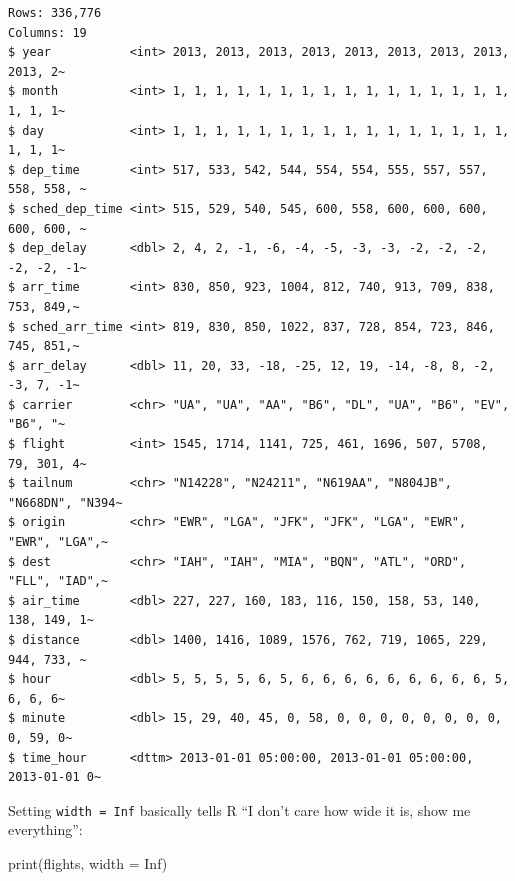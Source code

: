 \documentclass[
  letterpaper,
  DIV=11,
  numbers=noendperiod]{scrreprt}
\newenvironment{Shaded}{\begin{snugshade}}{\end{snugshade}}
\newcommand{\AttributeTok}[1]{\textcolor[rgb]{0.40,0.45,0.13}{#1}}
\newcommand{\ConstantTok}[1]{\textcolor[rgb]{0.56,0.35,0.01}{#1}}
\newcommand{\FunctionTok}[1]{\textcolor[rgb]{0.28,0.35,0.67}{#1}}
\newcommand{\NormalTok}[1]{\textcolor[rgb]{0.00,0.23,0.31}{#1}}
\begin{document}
\begin{verbatim}
Rows: 336,776
Columns: 19
$ year           <int> 2013, 2013, 2013, 2013, 2013, 2013, 2013, 2013, 2013, 2~
$ month          <int> 1, 1, 1, 1, 1, 1, 1, 1, 1, 1, 1, 1, 1, 1, 1, 1, 1, 1, 1~
$ day            <int> 1, 1, 1, 1, 1, 1, 1, 1, 1, 1, 1, 1, 1, 1, 1, 1, 1, 1, 1~
$ dep_time       <int> 517, 533, 542, 544, 554, 554, 555, 557, 557, 558, 558, ~
$ sched_dep_time <int> 515, 529, 540, 545, 600, 558, 600, 600, 600, 600, 600, ~
$ dep_delay      <dbl> 2, 4, 2, -1, -6, -4, -5, -3, -3, -2, -2, -2, -2, -2, -1~
$ arr_time       <int> 830, 850, 923, 1004, 812, 740, 913, 709, 838, 753, 849,~
$ sched_arr_time <int> 819, 830, 850, 1022, 837, 728, 854, 723, 846, 745, 851,~
$ arr_delay      <dbl> 11, 20, 33, -18, -25, 12, 19, -14, -8, 8, -2, -3, 7, -1~
$ carrier        <chr> "UA", "UA", "AA", "B6", "DL", "UA", "B6", "EV", "B6", "~
$ flight         <int> 1545, 1714, 1141, 725, 461, 1696, 507, 5708, 79, 301, 4~
$ tailnum        <chr> "N14228", "N24211", "N619AA", "N804JB", "N668DN", "N394~
$ origin         <chr> "EWR", "LGA", "JFK", "JFK", "LGA", "EWR", "EWR", "LGA",~
$ dest           <chr> "IAH", "IAH", "MIA", "BQN", "ATL", "ORD", "FLL", "IAD",~
$ air_time       <dbl> 227, 227, 160, 183, 116, 150, 158, 53, 140, 138, 149, 1~
$ distance       <dbl> 1400, 1416, 1089, 1576, 762, 719, 1065, 229, 944, 733, ~
$ hour           <dbl> 5, 5, 5, 5, 6, 5, 6, 6, 6, 6, 6, 6, 6, 6, 6, 5, 6, 6, 6~
$ minute         <dbl> 15, 29, 40, 45, 0, 58, 0, 0, 0, 0, 0, 0, 0, 0, 0, 59, 0~
$ time_hour      <dttm> 2013-01-01 05:00:00, 2013-01-01 05:00:00, 2013-01-01 0~
\end{verbatim}

Setting \texttt{width\ =\ Inf} basically tells R ``I don't care how wide
it is, show me everything'':

\begin{Shaded}
\begin{Highlighting}[]
\FunctionTok{print}\NormalTok{(flights, }\AttributeTok{width =} \ConstantTok{Inf}\NormalTok{)}
\end{Highlighting}
\end{Shaded}
\end{document}
